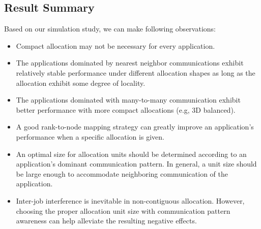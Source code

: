 \subsection{Result Summary}
\label{sec:summary}

Based on our simulation study, we can make following observations:

\begin{itemize}

    \item Compact allocation may not be necessary for every application. 
    
    \item The applications dominated by nearest neighbor communications exhibit 
    relatively stable performance under different allocation shapes as long as
    the allocation exhibit some degree of locality.
    
     
    \item The applications dominated with many-to-many communication exhibit 
    better performance with more compact allocations (e.g, 3D balanced).
    
    \item A good rank-to-node mapping strategy can greatly improve 
    an application's performance when a specific allocation is given.
    
    \item An optimal size for allocation units should be determined 
    according to an application's dominant communication pattern. 
    In general, a unit size should be large enough to accommodate  
    neighboring communication of the application. 
    
    \item Inter-job interference is inevitable in non-contiguous allocation. 
    However, choosing the proper allocation unit size with communication 
    pattern awareness can help alleviate the resulting negative effects. 
    
\end{itemize}





